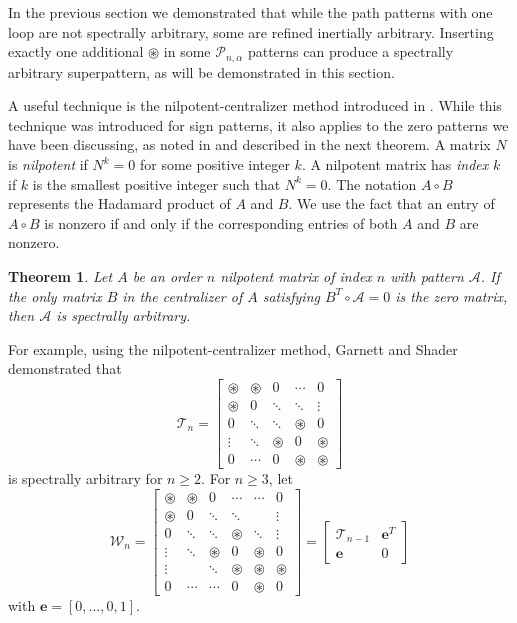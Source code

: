 \documentclass[10pt]{amsart}
\newtheorem{theorem}[proposition]{Theorem}
\begin{document}
In the previous section we demonstrated that while the path patterns with one loop are not
spectrally arbitrary, some are refined inertially arbitrary. 
Inserting exactly one additional ${\circledast}$ in some ${\mathcal{P}}_{n, \alpha}$ patterns can produce a spectrally arbitrary
superpattern, as will be demonstrated in this section. 

A useful technique is the nilpotent-centralizer method introduced in \cite{GS}.
While this technique was introduced for sign patterns, it 
also applies to the zero patterns we have been discussing, 
as noted in \cite{ESV} and described in the 
next theorem. A matrix $N$ is \emph{nilpotent} if $N^k=0$ for some positive integer $k$. A 
nilpotent matrix has \emph{index} $k$ if $k$ is the smallest positive integer such that $N^k=0$.
The notation $A\circ B$ represents the Hadamard product of $A$ and $B$. We use the fact that
an entry of $A\circ B$ is nonzero if and only if the corresponding entries of both $A$ and $B$ are nonzero. 

\begin{theorem}\cite{GS}\label{NC}
Let $A$ be an order $n$ nilpotent matrix of index $n$ with pattern ${\mathcal{A}}$. 
If the only matrix $B$ in the centralizer of $A$ satisfying $B^T \circ {\mathcal{A}} = 0$ is the zero matrix,
then  ${\mathcal{A}}$  is spectrally arbitrary.
\end{theorem}

For example, using  the nilpotent-centralizer method, Garnett and Shader~\cite{GS} demonstrated
 that $${\mathcal{T}}_n = \left[ \begin{array}{ccccc}
{\circledast}	& {\circledast} 	& 0		    & \cdots& 0 \\
{\circledast} 	& 0 		& \ddots 	& \ddots& \vdots \\
0 		& \ddots 	& \ddots 	&{\circledast}	& 0 \\
\vdots 	& \ddots    & {\circledast} 	& 0 		&{\circledast} \\
0 		& \cdots	& 0 		&{\circledast}	& {\circledast} \end{array} \right]$$ is spectrally arbitrary for $n\geq 2$. 
For $n\geq 3$, let 
$${\mathcal{W}}_{n} = \left[ \begin{array}{cccccc}
{\circledast}	& {\circledast} 	& 0		    & \cdots& \cdots    & 0 \\
{\circledast} 	& 0 		& \ddots 	& \ddots&           & \vdots \\
0 		& \ddots 	& \ddots 	&{\circledast}	& \ddots    & \vdots \\
\vdots 	& \ddots    & {\circledast} 	& 0 	&{\circledast}      & 0\\
\vdots 	&       	& \ddots 	&{\circledast}	& {\circledast}     &{\circledast} \\
0       & \cdots    & \cdots    &0      & {\circledast}     & 0\end{array} \right] = \left[ \begin{array}{cc}
{\mathcal{T}}_{n-1} 	& \mathbf{e}^T \\
\mathbf{e}	& 0 \end{array} \right]$$
with $\mathbf{e} = \left[0,\ldots,0, 1\right].$
\end{document}
